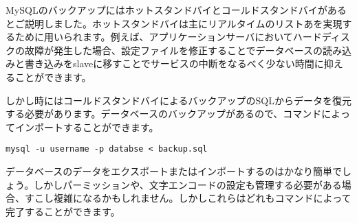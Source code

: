 MySQLのバックアップにはホットスタンドバイとコールドスタンドバイがあるとご説明しました。ホットスタンドバイは主にリアルタイムのリストあを実現するために用いられます。例えば、アプリケーションサーバにおいてハードディスクの故障が発生した場合、設定ファイルを修正することでデータベースの読み込みと書き込みをslaveに移すことでサービスの中断をなるべく少ない時間に抑えることができます。

しかし時にはコールドスタンドバイによるバックアップのSQLからデータを復元する必要があります。データベースのバックアップがあるので、コマンドによってインポートすることができます。

\begin{lstlisting}[numbers=none]
mysql -u username -p databse < backup.sql
\end{lstlisting}

データベースのデータをエクスポートまたはインポートするのはかなり簡単でしょう。しかしパーミッションや、文字エンコードの設定も管理する必要がある場合、すこし複雑になるかもしれません。しかしこれらはどれもコマンドによって完了することができます。
